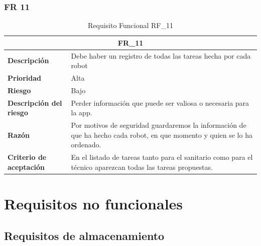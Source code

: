 \documentclass{scrreprt}
\begin{document}
\subsection{FR 11}
    \begin{table}[H]
        \label{tab:my-table}
        \begin{tabular}{|p{5cm}|p{11cm}|}
        \hline
        \multicolumn{2}{|c|}{\textbf{FR_11}} \\
        \hline
        \textbf{Descripción  }                      &  Debe haber un registro de todas las tareas hecha por cada robot                                              \\ \hline
        \textbf{Prioridad}                          & Alta                                                                                              \\ \hline
        \textbf{Riesgo}                          & Bajo                                                                                                \\ \hline
        \textbf{Descripción del riesgo}                    &  Perder información que puede ser valiosa o necesaria para la app.                                \\ \hline
        \textbf{Razón}                   & Por motivos de seguridad guardaremos la información de que ha hecho cada robot, en que momento y quien se lo ha ordenado.                                                                                                      \\ \hline
         \textbf{Criterio de aceptación}                    & En el listado de tareas tanto para el sanitario como para el técnico aparezcan todas las tareas propuestas.  \\ \hline
        \end{tabular}%
        
        \caption{Requisito Funcional RF_11}
\end{table}

\chapter{Requisitos no funcionales}

\section{Requisitos de almacenamiento}
\end{document}
